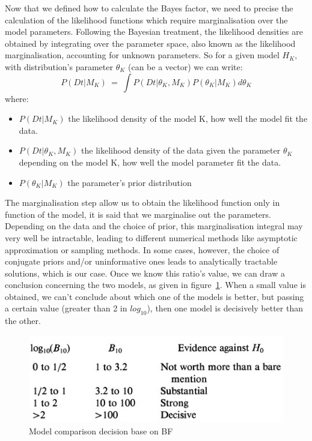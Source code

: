 \documentclass[twocolumn,12pt]{article}
\begin{document}
Now that we defined how to calculate the Bayes factor, we need to precise the calculation of the likelihood functions which require marginalisation over the model parameters.
Following the Bayesian treatment, the likelihood densities are obtained by integrating over the parameter space, also known as the likelihood marginalisation, accounting for unknown parameters.
So for a given model $H_K$, with distribution's parameter $\theta_K$ (can be a vector) we can write:
\begin{equation}
    P(Dt|M_K)\ =\ \int P(Dt|\theta_K,M_K)P(\theta_K|M_K)d\theta_K
    \label{equ:MargMod}
\end{equation}
where:
\begin{itemize}
    \item $P(Dt|M_K)$ the likelihood density of the model K, how well the model fit the data.
    \item $P(Dt|\theta_K,M_K)$ the likelihood density of the data given the parameter $\theta_K$ depending on the model K, how well the model parameter fit the data.
    \item $P(\theta_K|M_K)$ the parameter's prior distribution
\end{itemize}
The marginalisation step allow us to obtain the likelihood function only in function of the model, it is said that we marginalise out the parameters.
Depending on the data and the choice of prior, this marginalisation integral may very well be intractable, leading to different numerical methods like asymptotic approximation or sampling methods\cite{raftery}.
In some cases, however, the choice of conjugate priors and/or uninformative ones leads to analytically tractable solutions, which is our case.
Once we know this ratio's value, we can draw a conclusion concerning the two models, as given in figure~\ref{fig:compRatio}.
When a small value is obtained, we can't conclude about which one of the models is better, but passing a certain value (greater than 2 in $log_{10}$), then one model is decisively better than the other.
\begin{figure}[!]
    \centering
    \includegraphics[scale=0.6]{img/BFratios.jpg}
    \caption{Model comparison decision base on BF}
    \label{fig:compRatio}
\end{figure}
\end{document}
